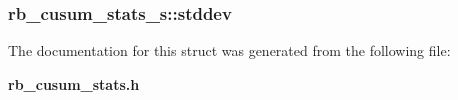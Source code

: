 \subsubsection[{stddev}]{ rb\+\_\+cusum\+\_\+stats\+\_\+s\+::stddev}\label{structrb__cusum__stats__s_a03eb11f63a69ab3002a8622896b3a537}


The documentation for this struct was generated from the following file\+:\begin{DoxyCompactItemize}
\item 
{\bf rb\+\_\+cusum\+\_\+stats.\+h}\end{DoxyCompactItemize}
